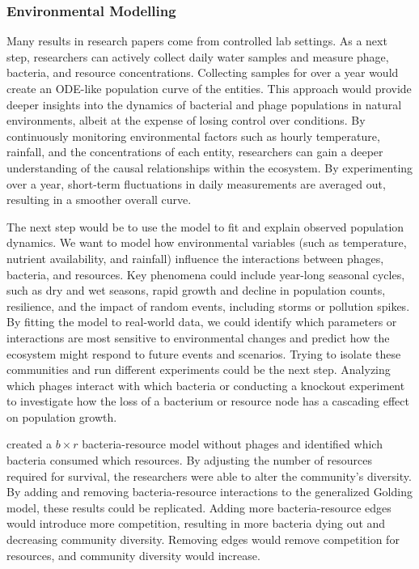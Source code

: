 \subsubsection{Environmental Modelling}
Many results in research papers come from controlled lab settings. 
As a next step, researchers can actively collect daily water samples and measure phage, bacteria, and resource concentrations. 
Collecting samples for over a year would create an ODE-like population curve of the entities. 
This approach would provide deeper insights into the dynamics of bacterial and phage populations in natural environments, albeit at the expense of losing control over conditions. 
By continuously monitoring environmental factors such as hourly temperature, rainfall, and the concentrations of each entity, researchers can gain a deeper understanding of the causal relationships within the ecosystem.
By experimenting over a year, short-term fluctuations in daily measurements are averaged out, resulting in a smoother overall curve.

The next step would be to use the model to fit and explain observed population dynamics. 
We want to model how environmental variables (such as temperature, nutrient availability, and rainfall) influence the interactions between phages, bacteria, and resources. 
Key phenomena could include year-long seasonal cycles, such as dry and wet seasons, rapid growth and decline in population counts, resilience, and the impact of random events, including storms or pollution spikes. 
By fitting the model to real-world data, we could identify which parameters or interactions are most sensitive to environmental changes and predict how the ecosystem might respond to future events and scenarios. 
Trying to isolate these communities and run different experiments could be the next step. 
Analyzing which phages interact with which bacteria or conducting a knockout experiment to investigate how the loss of a bacterium or resource node has a cascading effect on population growth. 

\citet{cleggCrossfeedingCreatesTipping2025} created a $b\times r$ bacteria-resource model without phages and identified which bacteria consumed which resources. 
By adjusting the number of resources required for survival, the researchers were able to alter the community's diversity. 
By adding and removing bacteria-resource interactions to the generalized Golding model, these results could be replicated. 
Adding more bacteria-resource edges would introduce more competition, resulting in more bacteria dying out and decreasing community diversity. 
Removing edges would remove competition for resources, and community diversity would increase. 

